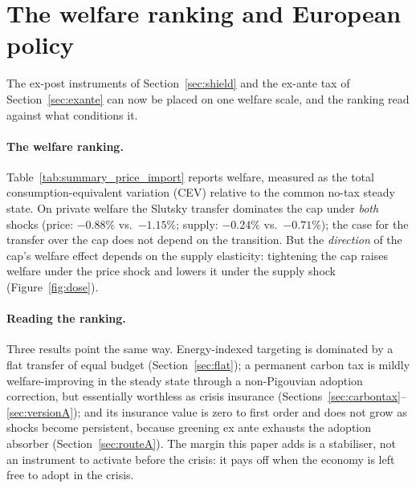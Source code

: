 \section{The welfare ranking and European policy}
\label{sec:synthesis}\label{sec:policy}

The ex-post instruments of Section~\ref{sec:shield} and the ex-ante tax of
Section~\ref{sec:exante} can now be placed on one welfare scale, and the ranking
read against what conditions it.

\paragraph{The welfare ranking.}\label{sec:ranking} Table~\ref{tab:summary_price_import} reports welfare, measured as the total
consumption-equivalent variation (CEV) relative to the common no-tax steady
state. On private welfare the Slutsky transfer dominates the cap under
\emph{both} shocks (price: $-0.88\%$ vs.\ $-1.15\%$; supply: $-0.24\%$ vs.\ $-0.71\%$); the case for the transfer over the cap
does not depend on the transition. But the \emph{direction} of the cap's welfare
effect depends on the supply elasticity: tightening the cap raises welfare under
the price shock and lowers it under the supply shock (Figure~\ref{fig:dose}).



\paragraph{Reading the ranking.} Three results point the same way. Energy-indexed targeting
is dominated by a flat transfer of equal budget (Section~\ref{sec:flat}); a
permanent carbon tax is mildly welfare-improving in the steady state through a
non-Pigouvian adoption correction, but essentially worthless as crisis insurance
(Sections~\ref{sec:carbontax}--\ref{sec:versionA}); and its insurance value is zero
to first order and does not grow as shocks become persistent, because greening
ex ante exhausts the adoption absorber (Section~\ref{sec:routeA}). The margin this
paper adds is a stabiliser, not an instrument to activate before the crisis: it
pays off when the economy is left free to adopt in the crisis.

